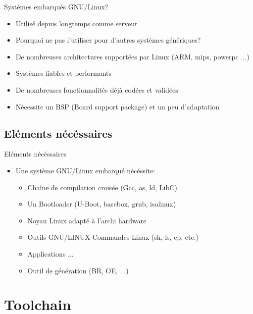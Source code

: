 \begin{frame}{Systèmes embarqués GNU/Linux?}
  \begin{itemize}
  \item Utilisé depuis longtemps comme serveur
  \item Pourquoi ne pas l'utiliser pour d'autres systèmes génériques?
  \item De nombreuses architectures supportées par Linux (ARM, mips, powerpc ...)
  \item Systèmes fiables et performants
  \item De nombreuses fonctionnalités déjà codées et validées
  \item Nécessite un BSP (Board support package) et un peu d'adaptation
  \end{itemize}
\end{frame}

\subsection{Eléments nécéssaires}
\begin{frame}{Eléments nécéssaires}
  \begin{itemize}
  \item Une système GNU/Linux embarqué nécéssite:
    \begin{itemize}
    \item Chaîne de compilation croisée (Gcc, as, ld, LibC)
    \item Un Bootloader (U-Boot, barebox, grub, isolinux)
    \item Noyau Linux adapté à l'archi hardware
    \item Outils GNU/LINUX Commandes Linux (sh, ls, cp, etc.)
    \item Applications ...
    \item Outil de génération (BR, OE, ...)
    \end{itemize}
  \end{itemize}
\end{frame}

\section{Toolchain}

